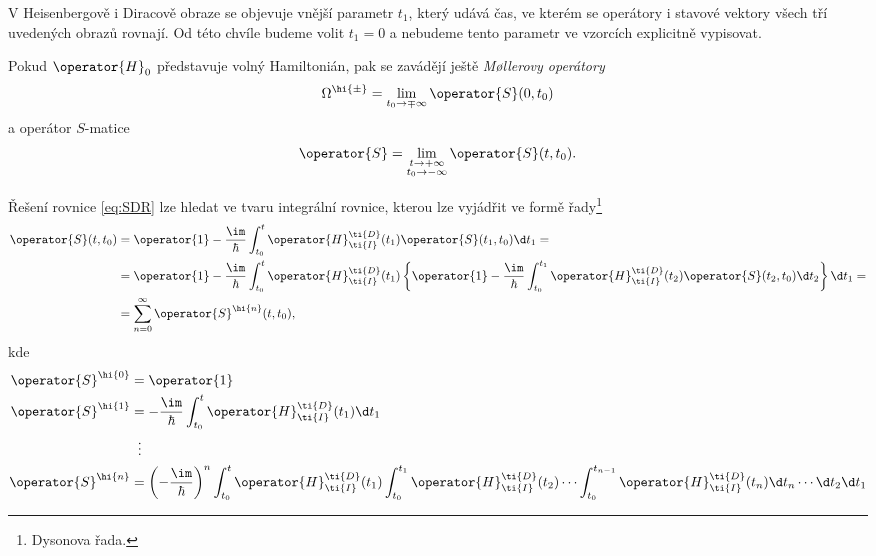 V Heisenbergově i Diracově obraze se objevuje vnější parametr $t_{1}$, který udává čas, ve kterém se operátory i stavové vektory všech tří uvedených obrazů rovnají.
Od této chvíle budeme volit $t_{1}=0$ a nebudeme tento parametr ve vzorcích explicitně vypisovat.

Pokud $\operator{H}_{0}$ představuje volný Hamiltonián, pak se zavádějí ještě
\emph{M\o llerovy operátory}
\begin{equation}
    \Omega^{\hi{\pm}}
        =\lim_{t_{0}\rightarrow\mp\infty}\operator{S}(0,t_{0})
\end{equation}
a operátor $S$-matice
\begin{equation}
    \operator{S}
        =\lim_{\substack{t\rightarrow+\infty\\t_{0}\rightarrow-\infty}}\operator{S}(t,t_{0}).
\end{equation}

Řešení rovnice \eqref{eq:SDR} lze hledat ve tvaru integrální rovnice, kterou lze vyjádřit ve formě řady\footnote{Dysonova řada.}
\begin{align}
    \operator{S}(t,t_{0})
        &=\operator{1}-\frac{\im}{\hbar}\int_{t_{0}}^{t}\operator{H}_{\ti{I}}^{\ti{D}}(t_{1})
            \operator{S}(t_{1},t_{0})\d t_{1}=\nonumber\\
        &=\operator{1}-\frac{\im}{\hbar}\int_{t_{0}}^{t}\operator{H}_{\ti{I}}^{\ti{D}}(t_{1})
        \left\{\operator{1}-\frac{\im}{\hbar}\int_{t_{0}}^{t_{1}}\operator{H}_{\ti{I}}^{\ti{D}}(t_{2})
            \operator{S}(t_{2},t_{0})\d t_{2}\right\}
        \d t_{1}=\nonumber\\
        &=\sum_{n=0}^{\infty}\operator{S}^{\hi{n}}(t,t_{0}),
        \label{eq:SExpansion}
\end{align}
kde
\begin{subequations}\label{eq:SExpansionItems}
    \begin{align}
        \operator{S}^{\hi{0}}
            &=\operator{1}\\
        \operator{S}^{\hi{1}}
            &=-\frac{\im}{\hbar}\int_{t_{0}}^{t}\operator{H}_{\ti{I}}^{\ti{D}}(t_{1})\d t_{1}\\
            &\;\;\vdots\nonumber\\
        \operator{S}^{\hi{n}}
            &=\left(-\frac{\im}{\hbar}\right)^{n}
                \int_{t_{0}}^{t}\operator{H}_{\ti{I}}^{\ti{D}}(t_{1})
                \int_{t_{0}}^{t_{1}}\operator{H}_{\ti{I}}^{\ti{D}}(t_{2})\dotsm
                \int_{t_{0}}^{t_{n-1}}\operator{H}_{\ti{I}}^{\ti{D}}(t_{n})\d t_{n}
                    \dotsm\d t_{2}\d t_{1}
    \end{align}
\end{subequations}

